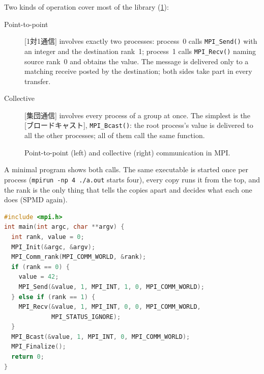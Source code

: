 \documentclass[../main.tex]{subfiles}
\begin{document}
Two kinds of operation cover most of the library
(\cref{fig:l02-mpi-messages}):
\begin{description}
  \item[Point-to-point]  [1対1通信]
    involves exactly two processes: process~0 calls
    \texttt{MPI\_Send()} with an integer and the destination rank~1;
    process~1 calls \texttt{MPI\_Recv()} naming source rank~0 and obtains
    the value.  The message is delivered only to a matching receive posted
    by the destination; both sides take part in every transfer.
  \item[Collective]  [集団通信] involves
    every process of a group at once.  The simplest is the
    [ブロードキャスト], \texttt{MPI\_Bcast()}: the root
    process's value is delivered to all the other processes; all of them
    call the same function.
\end{description}

\begin{figure}[tb]
  \centering
  
  \caption{Point-to-point (left) and collective (right) communication in
    MPI.}
  \label{fig:l02-mpi-messages}
\end{figure}

A minimal program shows both calls.  The same executable is started
once per process (\texttt{mpirun -np 4 ./a.out} starts four), every copy
runs it from the top, and the rank is the only thing that tells the
copies apart and decides what each one does (SPMD again).
\begin{lstlisting}[language=C, numbers=none]
#include <mpi.h>
int main(int argc, char **argv) {
  int rank, value = 0;
  MPI_Init(&argc, &argv);
  MPI_Comm_rank(MPI_COMM_WORLD, &rank);
  if (rank == 0) {
    value = 42;
    MPI_Send(&value, 1, MPI_INT, 1, 0, MPI_COMM_WORLD);
  } else if (rank == 1) {
    MPI_Recv(&value, 1, MPI_INT, 0, 0, MPI_COMM_WORLD,
             MPI_STATUS_IGNORE);
  }
  MPI_Bcast(&value, 1, MPI_INT, 0, MPI_COMM_WORLD);
  MPI_Finalize();
  return 0;
}
\end{lstlisting}
\end{document}
